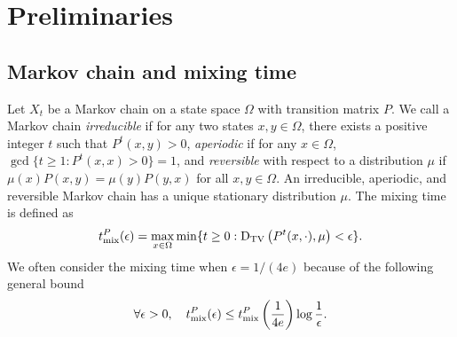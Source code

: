\documentclass[11pt]{amsart}
\def\-#1{\mathrm{#1}}
\newcommand{\DTV}[2]{\-D_{\mathrm{TV}}\left({#1},{#2}\right)}
\theoremstyle{definition}
\theoremstyle{remark}
\begin{document}


\section{Preliminaries}

\subsection{Markov chain and mixing time}
Let $X_t$ be a Markov chain on a state space $\Omega$ with transition matrix $P$. 
We call a Markov chain \emph{irreducible} if for any two states $x,y \in \Omega$, there exists a positive integer $t$ such that $P^t(x,y) > 0$,
\emph{aperiodic} if for any $x \in \Omega$, $\gcd\{t \geq 1: P^t(x,x) > 0\} = 1$,
and \emph{reversible} with respect to a distribution $\mu$ if $\mu(x)P(x,y) = \mu(y)P(y,x)$ for all $x,y \in \Omega$. 
An irreducible, aperiodic, and reversible Markov chain has a unique stationary distribution $\mu$.
The mixing time is defined as
\begin{align*}
    t_{\textnormal{mix}}^P(\epsilon) = \max_{x \in \Omega} \min\{t \geq 0: \DTV{P^t(x,\cdot)}{\mu} < \epsilon\}.
\end{align*}
We often consider the mixing time when $\epsilon = 1/(4e)$ because of the following general bound
\begin{align}\label{eq:general-bound-on-mixing-time}
\forall \epsilon > 0, \quad t_{\textnormal{mix}}^P(\epsilon) \leq t_{\textnormal{mix}}^P\left(\frac{1}{4e}\right)\log \frac{1}{\epsilon}.
\end{align}
\end{document}
